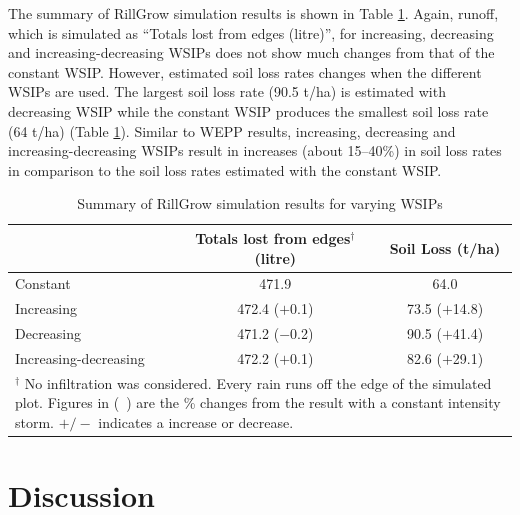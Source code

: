 The summary of RillGrow simulation results is shown in Table
\ref{tab:RillGrowSimulationResults}. Again, runoff, which is simulated as
``Totals lost from edges (litre)'', for increasing, decreasing and
increasing-decreasing WSIPs does not show much changes from that of the constant
WSIP. However, estimated soil loss rates changes when the different WSIPs are
used. The largest soil loss rate (90.5 t/ha) is estimated with decreasing WSIP
while the constant WSIP produces the smallest soil loss rate (64 t/ha) (Table
\ref{tab:RillGrowSimulationResults}). Similar to WEPP results, increasing,
decreasing and increasing-decreasing WSIPs result in increases (about 15--40\%)
in soil loss rates in comparison to the soil loss rates estimated with the
constant WSIP.

\begin{table}[htbp]
  \centering
  \small
  \caption{Summary of RillGrow simulation results for varying WSIPs}
  \label{tab:RillGrowSimulationResults}
    \begin{tabular}{lcc}
    \toprule
     & Totals lost from edges$^\dagger$ (litre) & Soil Loss (t/ha)\\
    \midrule%
    Constant & 471.9 & 64.0 \\
    Increasing & 472.4 ($+$0.1)& 73.5 ($+$14.8)\\
    Decreasing & 471.2 ($-$0.2)& 90.5 ($+$41.4)\\
    Increasing-decreasing & 472.2 ($+$0.1)& 82.6 ($+$29.1)\\
    \bottomrule
    \multicolumn{3}{p{11cm}}{\footnotesize $^\dagger$ No
infiltration was considered. Every rain runs off the edge of the simulated plot.
Figures in (\ ) are the \% changes from the result with a constant intensity
storm. $+/-$ indicates a increase or decrease.}\\
    \end{tabular}
\end{table}



\section{Discussion}
\label{sec:ImpactsOfRainfallIntensityChangesOnRunoffAndErosionDiscussion}

